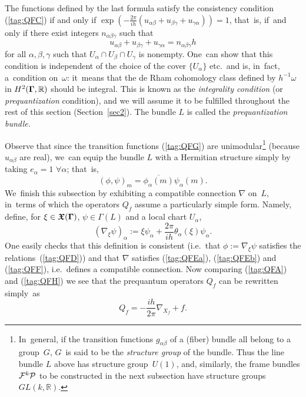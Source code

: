 \documentclass[11pt]{amsart}
\numberwithin{equation}{section}
\theoremstyle{remark}
\newcommand\Omg{{\bigam}}   %
\newcommand\FF{\Cal F}
\newcommand\PP{{\Cal P}}
\newcommand\RR{\mathbb R}
\newcommand{\bigam}{\mbox{\boldmath $\Gamma$}}
\newcommand{\bfrakX}{\mbox{\boldmath $\mathfrak X$}}
\begin{document}
    The functions defined by the last formula satisfy the consistency condition
(\ref{tag:QFC}) if and only if
$\exp(-\frac{2\pi}{ih}(u_{\alpha\beta}+u_{\beta\gamma}+
u_{\gamma\alpha}))=1$, that~is, if~and only if there exist integers
$n_{\alpha\beta\gamma}$ such that
$$ u_{\alpha\beta}+u_{\beta\gamma}+u_{\gamma\alpha}=n_{\alpha\beta\gamma}h  $$
for all $\alpha,\beta,\gamma$ such that $U_\alpha\cap U_\beta\cap U_\gamma$ is
nonempty. One~can show that this condition is independent of the choice of the
cover $\{U_\alpha\}$ etc.~and is, in~fact, a~condition on~$\omega$: it~means
that the de Rham cohomology class defined by $h^{-1}\omega$ in $H^2(\Omg,\RR)$
should be integral. This is known as the {\sl integrality condition\/} (or~{\sl
prequantization\/} condition), and we will assume it to be fulfilled throughout
the rest of this section (Section~\ref{sec2}). The bundle $L$ is called the
{\sl prequantization bundle.\/}


Observe that since the transition functions (\ref{tag:QFG}) are
unimodular\footnote{In~general, if the transition functions $g_{\alpha\beta}$
of a (fiber) bundle all belong to a group~$G$, $G$~is said to be the
{\sl structure group\/} of the bundle. Thus the line bundle $L$ above has
structure group~$U(1)$, and, similarly, the frame bundles $\FF^k\PP$ to be
constructed in the next subsection have structure groups $GL(k,\RR)$.}
(because $u_{\alpha\beta}$ are real), we~can equip the bundle $L$ with a
Hermitian structure simply by taking $e_\alpha=1$ $\forall\alpha$; that~is,
$$ (\phi,\psi)_m = \overline{\phi_\alpha(m)} \psi_\alpha(m).  $$
We~finish this subsection by exhibiting a compatible connection $\nabla$
on~$L$, in~terms of which the operators $Q_f$ assume a particularly simple
form. Namely, define, for $\xi\in \bfrakX(\Omg)$, $\psi\in\Gamma(L)$ and a
local chart $U_\alpha$,
\begin{equation}  (\nabla_\xi \psi)_\alpha := \xi\psi_\alpha + \frac{2\pi}{ih}
\theta_\alpha(\xi) \psi_\alpha.  \label{tag:QFH}  \end{equation}
One easily checks that this definition is consistent (i.e.~that $\phi:=\nabla
_\xi\psi$ satisfies the relations~(\ref{tag:QFD})) and that $\nabla$ satisfies
(\ref{tag:QFEa}), (\ref{tag:QFEb}) and (\ref{tag:QFF}), i.e.~defines a
compatible connection. Now comparing (\ref{tag:QFA}) and (\ref{tag:QFH}) we see
that the prequantum operators $Q_f$ can be rewritten simply~as
\begin{equation}  Q_f = -\frac{ih}{2\pi} \nabla_{X_f} + f.  \label{tag:QFI}
\end{equation}
\end{document}
